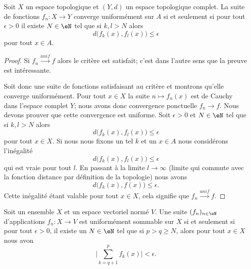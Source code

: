 \begin{proposition}   \label{PropNTEynwq}
	Soit \( X\) un espace topologique et \( (Y,d)\) un espace topologique complet. La suite de fonctions \( f_n\colon X\to Y\) converge uniformément sur \( A\) si et seulement si pour tout \( \epsilon>0\) il existe \( N\in \eN\) tel que si \( k,l>N\) alors
	\begin{equation}
		d\big( f_k(x),f_l(x) \big)\leq \epsilon
	\end{equation}
	pour tout \( x\in A\).
\end{proposition}

\begin{proof}
	Si \( f_n\stackrel{unif}{\longrightarrow}f\) alors le critère est satisfait; c'est dans l'autre sens que la preuve est intéressante.

	Soit donc une suite de fonctions satisfaisant au critère et montrons qu'elle converge uniformément. Pour tout \( x\in X\) la suite \( n\mapsto f_n(x)\) est de Cauchy dans l'espace complet \( Y\); nous avons donc convergence ponctuelle \( f_n\to f\). Nous devons prouver que cette convergence est uniforme. Soit \( \epsilon>0\) et \( N\in \eN\) tel que si \( k,l>N\) alors
	\begin{equation}
		d\big( f_k(x),f_l(x) \big)\leq \epsilon
	\end{equation}
	pour tout \( x\in X\). Si nous nous fixons un tel \( k\) et un \( x\in A\) nous considérons l'inégalité
	\begin{equation}
		d\big( f_k(x),f_l(x) \big)\leq \epsilon
	\end{equation}
	qui est vraie pour tout \( l\). En passant à la limite \( l\to\infty\) (limite qui commute avec la fonction distance par définition de la topologie) nous avons
	\begin{equation}
		d\big( f_k(x),f(x) \big)\leq \epsilon.
	\end{equation}
	Cette inégalité étant valable pour tout \( x\in X\), cela signifie que \( f_n\stackrel{unif}{\longrightarrow}f\).
\end{proof}



\begin{proposition}	\label{PROPooEBYWooOXUwry}
	Soit un ensemble \( X\) et un espace vectoriel normé \( V\). Une suite \( (f_n)_{n\in \eN}\) d'applications \(f_n \colon X\to V  \) est uniformément sommable sur \( X\) si et seulement si pour tout \( \epsilon>0\), il existe un \( N\in \eN\) tel que si \( p>q\geq N\), alors pour tout \( x\in X\) nous avon
	\begin{equation}
		\big| \sum_{k=q+1}^pf_k(x) \big|<\epsilon.
	\end{equation}
\end{proposition}

